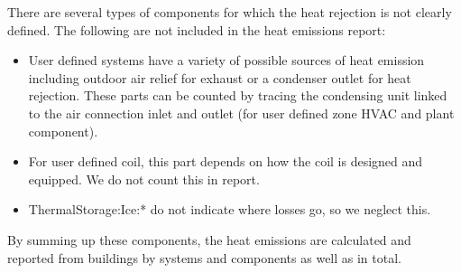 There are several types of components for which the heat rejection is not clearly defined. The following are not included in the heat emissions report:

\begin{itemize}
  \item User defined systems have a variety of possible sources of heat emission including outdoor air relief for exhaust or a condenser outlet for heat rejection. These parts can be counted by tracing the condensing unit linked to the air connection inlet and outlet (for user defined zone HVAC and plant component). 
  \item For user defined coil, this part depends on how the coil is designed and equipped. We do not count this in report.
  \item ThermalStorage:Ice:* do not indicate where losses go, so we neglect this.
\end{itemize}

By summing up these components, the heat emissions are calculated and reported from buildings by systems and components as well as in total.
